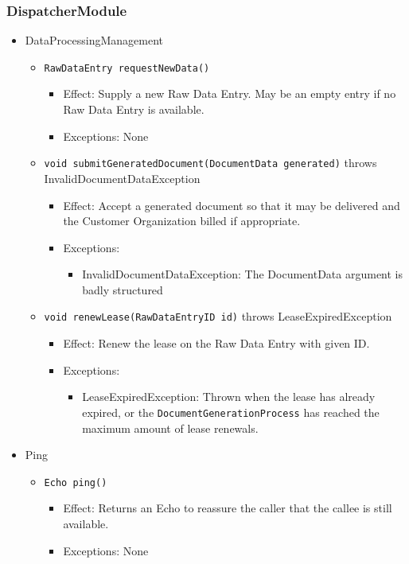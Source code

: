 \documentclass[a4paper,10pt]{article}
\begin{document}
\subsubsection*{DispatcherModule}
\begin{itemize}
    \item DataProcessingManagement
    \begin{itemize}
        \item \texttt{RawDataEntry requestNewData()}
        \begin{itemize}
            \item Effect: Supply a new Raw Data Entry. May be an empty entry if no Raw Data Entry is available.
            \item Exceptions: None
        \end{itemize}
        
        \item \texttt{void submitGeneratedDocument(DocumentData generated)} throws InvalidDocumentDataException
        \begin{itemize}
            \item Effect: Accept a generated document so that it may be delivered and the Customer Organization billed if appropriate.
            \item Exceptions:
            \begin{itemize}
            	\item InvalidDocumentDataException: The DocumentData argument is badly structured
            \end{itemize}
        \end{itemize}
        
        \item \texttt{void renewLease(RawDataEntryID id)} throws LeaseExpiredException
        \begin{itemize}
            \item Effect: Renew the lease on the Raw Data Entry with given ID.
            \item Exceptions: 
            \begin{itemize}
                \item LeaseExpiredException: Thrown when the lease has already expired, or the \texttt{Document\-Generation\-Process} has reached the maximum amount of lease renewals.
            \end{itemize}
        \end{itemize}
    \end{itemize}
	\item Ping
	\begin{itemize}
		\item \texttt{Echo ping()}
		\begin{itemize}
			\item Effect: Returns an Echo to reassure the caller that the callee is still available. 
			\item Exceptions: None
		\end{itemize}
	\end{itemize}
\end{itemize}
\end{document}
